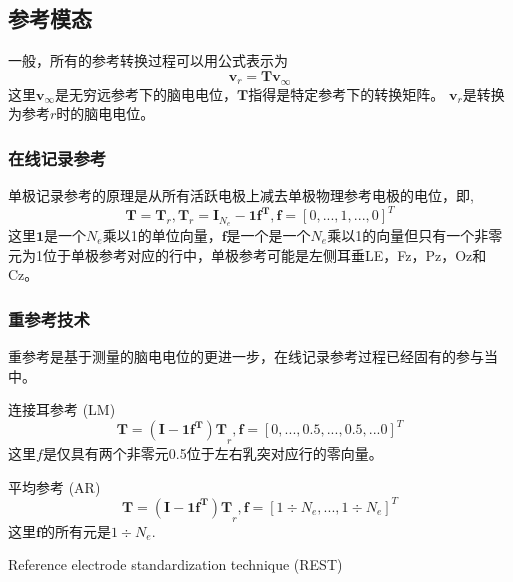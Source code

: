 \subsection{参考模态}
一般，所有的参考转换过程可以用公式表示为
\begin{equation}\label{2.3}
\mathbf{v}_r=\mathbf{Tv}_{\infty}
\end{equation}
这里$\mathbf{v}_{\infty}$是无穷远参考下的脑电电位，$\mathbf{T}$指得是特定参考下的转换矩阵。 $\mathbf{v}_r$是转换为参考$r$时的脑电电位。
\subsubsection{在线记录参考}
单极记录参考的原理是从所有活跃电极上减去单极物理参考电极的电位，即,
\begin{equation}\label{2.4}
\mathbf{T}=\mathbf{T}_{r},\mathbf{T}_{r}=\mathbf{I}_{N_{e}}-\mathbf{1f^T},\mathbf{f}=[0,...,1,...,0]^T
\end{equation}
这里$\mathbf{1}$是一个$N_{e}$乘以1的单位向量，$\mathbf{f}$是一个是一个$N_{e}$乘以1的向量但只有一个非零元为1位于单极参考对应的行中，单极参考可能是左侧耳垂LE，Fz，Pz，Oz和Cz。

\subsubsection{重参考技术}
重参考是基于测量的脑电电位的更进一步，在线记录参考过程已经固有的参与当中。

连接耳参考 (LM)
\begin{equation}\label{2.5}
\mathbf{T}=\mathbf{(I-1f^T)T}_{r},\mathbf{f}=[0,...,0.5,...,0.5,...0]^T
\end{equation}
这里$f$是仅具有两个非零元0.5位于左右乳突对应行的零向量。

平均参考 (AR)
\begin{equation}\label{2.6}
\mathbf{T}=\mathbf{(I-1f^T)T}_{r},\mathbf{f}=[1\div{N_e},...,1\div{N_e}]^T
\end{equation}
这里$\mathbf{f}$的所有元是$1\div{N_e}$.

Reference electrode standardization technique (REST)


